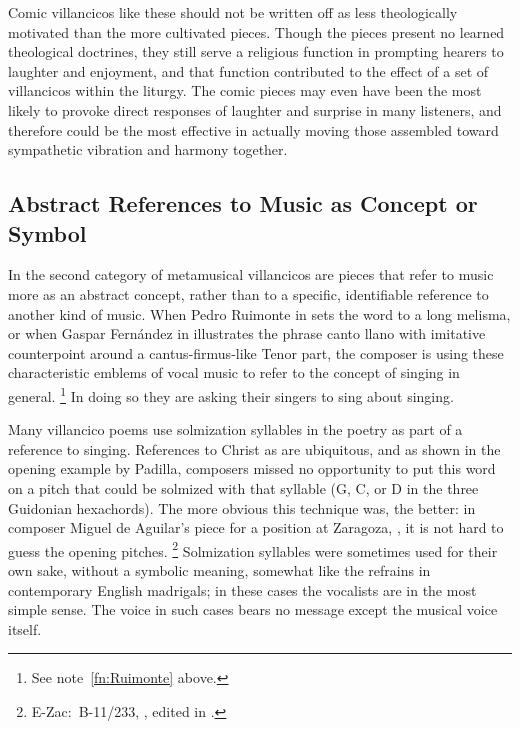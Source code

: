 Comic villancicos like these should not be written off as less theologically motivated than the more cultivated pieces.
Though the  pieces present no learned theological doctrines, they still serve a religious function in prompting hearers to laughter and enjoyment, and that function contributed to the effect of a set of villancicos within the liturgy.
The comic pieces may even have been the most likely to provoke direct responses of laughter and surprise in many listeners, and therefore could be the most effective in actually moving those assembled toward sympathetic vibration and harmony together. 

\subsection{Abstract References to Music as Concept or Symbol}

In the second category of metamusical villancicos are pieces that refer to music more as an abstract concept, rather than to a specific, identifiable reference to another kind of music.
When Pedro Ruimonte in  sets the word   to a long melisma, or when Gaspar Fernández in  illustrates the phrase {canto llano}  with imitative counterpoint around a cantus-firmus-like Tenor part, the composer is using these characteristic emblems of vocal music to refer to the concept of singing in general.%
	\footnote{%
	See note~\ref{fn:Ruimonte} above.
	}
In doing so they are asking their singers to sing about singing.

Many villancico poems use solmization syllables in the poetry as part of a reference to singing.
References to Christ as   are ubiquitous, and as shown in the opening example by Padilla, composers missed no opportunity to put this word on a pitch that could be solmized with that syllable (G, C, or D in the three Guidonian hexachords).
The more obvious this technique was, the better: in composer Miguel de Aguilar's   piece for a position at Zaragoza,  , it is not hard to guess the opening pitches.%
	\footnote{%
	E-Zac:~B-11/233, , edited in \autocite[34--64]{Ezquerro:MME55}.
	}
Solmization syllables were sometimes used for their own sake, without a symbolic meaning, somewhat like the  refrains in contemporary English madrigals; in these cases the vocalists are  in the most simple sense.
The voice in such cases bears no message except the musical voice itself.

